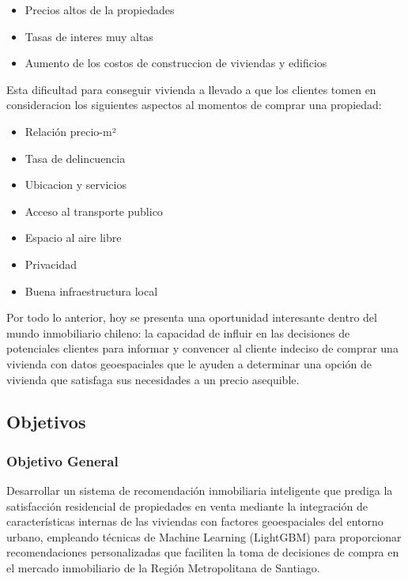 \begin{itemize}
    \item Precios altos de la propiedades
    \item Tasas de interes muy altas
    \item Aumento de los costos de construccion de viviendas y edificios
\end{itemize}
Esta dificultad para conseguir vivienda a llevado a que los clientes tomen en consideracion los siguientes aspectos al momentos de comprar una propiedad:

\begin{itemize}
    \item Relación precio-m²
    \item Tasa de delincuencia
    \item Ubicacion y servicios
    \item Acceso al transporte publico
    \item Espacio al aire libre
    \item Privacidad
    \item Buena infraestructura local
\end{itemize}

Por todo lo anterior, hoy se presenta una oportunidad interesante dentro del mundo inmobiliario chileno: la capacidad de influir en las decisiones de potenciales clientes para informar y convencer al cliente indeciso de comprar una vivienda con datos geoespaciales que le ayuden a determinar una opción de vivienda que satisfaga sus necesidades a un precio asequible.

\subsection{Objetivos}

\subsubsection{Objetivo General}

Desarrollar un sistema de recomendación inmobiliaria inteligente que prediga la satisfacción residencial de propiedades en venta mediante la integración de características internas de las viviendas con factores geoespaciales del entorno urbano, empleando técnicas de Machine Learning (LightGBM) para proporcionar recomendaciones personalizadas que faciliten la toma de decisiones de compra en el mercado inmobiliario de la Región Metropolitana de Santiago.

